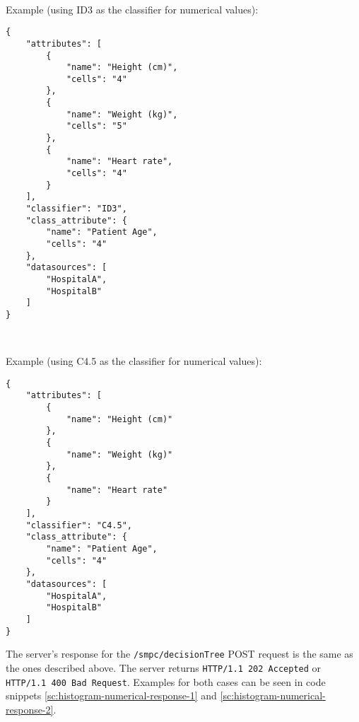 \begin{description}[labelwidth=5em, leftmargin=\dimexpr\labelwidth+\labelsep\relax]
\ \\
\begin{minipage}{\linewidth}
  Example (using ID3 as the classifier for numerical values):\\
{
\begin{verbatim}
{
    "attributes": [
        {
            "name": "Height (cm)",
            "cells": "4"
        },
        {
            "name": "Weight (kg)",
            "cells": "5"
        },
        {
            "name": "Heart rate",
            "cells": "4"
        }
    ],
    "classifier": "ID3",
    "class_attribute": {
        "name": "Patient Age",
        "cells": "4"
    },
    "datasources": [
        "HospitalA",
        "HospitalB"
    ]
}
\end{verbatim}
\label{sc:decisionTree-post-numerical-id3}
}
\end{minipage}
\ \\
\begin{minipage}{\linewidth}
  Example (using C4.5 as the classifier for numerical values):\\
{
\begin{verbatim}
{
    "attributes": [
        {
            "name": "Height (cm)"
        },
        {
            "name": "Weight (kg)"
        },
        {
            "name": "Heart rate"
        }
    ],
    "classifier": "C4.5",
    "class_attribute": {
        "name": "Patient Age",
        "cells": "4"
    },
    "datasources": [
        "HospitalA",
        "HospitalB"
    ]
}
\end{verbatim}
\label{sc:decisionTree-post-categorical}
}
\end{minipage}

\item[Response:] The server's response for the \texttt{/smpc/decisionTree} POST request is the same as the ones described above. The server returns \texttt{HTTP/1.1 202 Accepted} or \texttt{HTTP/1.1 400 Bad Request}. Examples for both cases can be seen in code snippets \ref{sc:histogram-numerical-response-1} and \ref{sc:histogram-numerical-response-2}.

\end{description}




